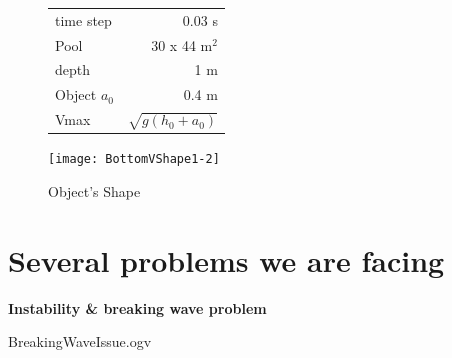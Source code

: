 \documentclass[compress,t]{beamer}
\begin{document}
			\begin{frame}
				\begin{figure}
					\begin{minipage}{0.3\linewidth}
						\begin{tabular}{l|r}
							\hline
							time step & 0.03 s \\
							Pool & 30 x 44 m$^2$ \\
							depth & 1 m \\
							Object $a_0$ & 0.4 m\\
							Vmax & $\sqrt{g(h_0 + a_0)}$ \\
							\hline
						\end{tabular}
					\end{minipage}
					\hfill
					\begin{minipage}{0.5\linewidth}
					\end{minipage}
				\end{figure}
				\begin{figure}
					\begin{minipage}{0.3\linewidth}
						\texttt{[image: BottomVShape1-2]}
						\caption{Object's Shape}
					\end{minipage}
					\hfill
					\begin{minipage}{0.5\linewidth}
					\end{minipage}
				\end{figure}
			\end{frame}
						
	\section{Several problems we are facing}				
		\begin{frame}
			\textbf{Instability \& breaking wave problem}\\
			\begin{center}
  					{BreakingWaveIssue.ogv}
				\end{center}
		\end{frame}
		
\end{document}
